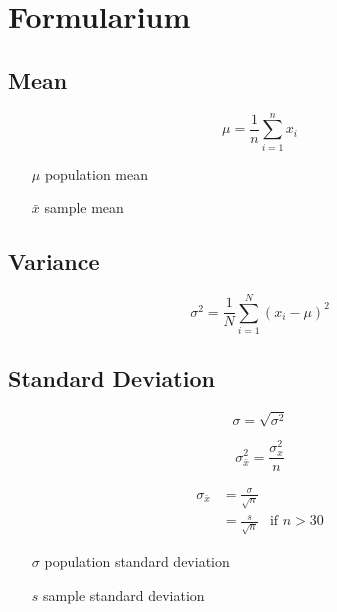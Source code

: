 \documentclass[a4paper]{article}
\begin{document}
\twocolumn

\section{Formularium}

\subsection{Mean}

\begin{equation}
\mu = \frac{1}{n}\sum_{i=1}^n x_i
\end{equation}

\begin{itemize}
\item[$\mu$] population mean
\item[$\bar{x}$] sample mean
\end{itemize}

\subsection{Variance}

\begin{equation}
\sigma^2 =\frac 1N \sum_{i=1}^N (x_i - \mu)^2
\end{equation}

\subsection{Standard Deviation}
\begin{equation}
\sigma = \sqrt{\sigma^2}
\end{equation}

\begin{equation}
\sigma_{\bar{x}}^2 = \frac{\sigma_{x}^2}{n}
\end{equation}

\begin{align}
\sigma_{\bar{x}}  &= \frac{\sigma}{\sqrt{n}}  & \\
                  &= \frac{s}{\sqrt{n}}       &\text{if $n > 30$}
\end{align}

\begin{itemize}
\item[$\sigma$] population standard deviation
\item[$s$] sample standard deviation
\end{itemize}


% 
\end{document}
